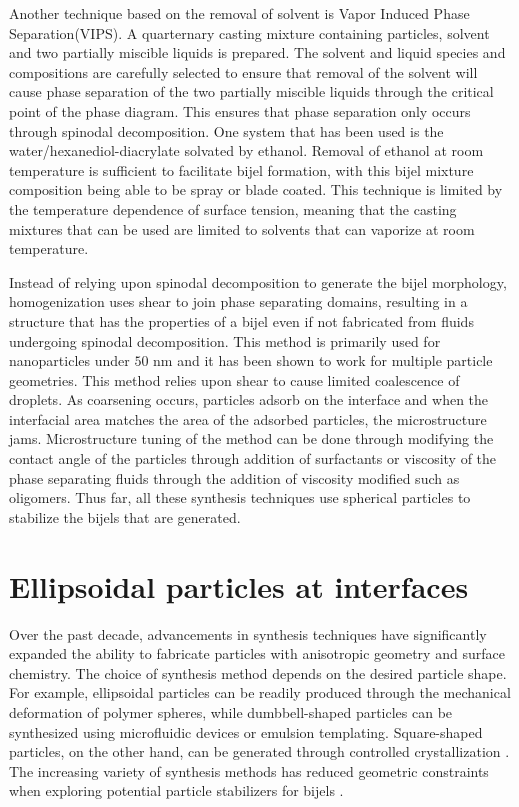 Another technique based on the removal of solvent is Vapor Induced Phase Separation(VIPS). \cite{wang_scalable_2020} A quarternary casting mixture
containing particles, solvent and two partially miscible liquids is prepared. The solvent and liquid species and compositions are carefully selected to ensure that 
removal of the solvent will cause phase separation of the two partially miscible liquids through the critical point of the phase diagram. This ensures that phase separation
only occurs through spinodal decomposition. One system that has been 
used is the water/hexanediol-diacrylate solvated by ethanol. Removal of ethanol at room temperature is sufficient to facilitate bijel formation, with this bijel
mixture composition being able to be spray or blade coated. This technique is limited by the temperature dependence of surface tension, meaning that the casting mixtures
that can be used are limited to solvents that can vaporize at room temperature.

Instead of relying upon spinodal decomposition to generate the bijel morphology, homogenization uses shear to join phase separating domains, resulting in a 
structure that has the properties of a bijel even if not fabricated from fluids undergoing spinodal decomposition. \cite{huang_bicontinuous_2017, cai_bijels_2017} 
This method is primarily used for nanoparticles under $50$ nm and it has been shown to work for multiple particle geometries. This method relies upon
shear to cause limited coalescence of droplets. As coarsening occurs, particles adsorb on the interface and when the interfacial area matches the area of the
adsorbed particles, the microstructure jams. Microstructure tuning of the method can be done through modifying the contact angle of the particles through addition of
surfactants or viscosity of the phase separating fluids through the addition of viscosity modified such as oligomers. Thus far, all these synthesis techniques use
spherical particles to stabilize the bijels that are generated. 

\section{Ellipsoidal particles at interfaces}

Over the past decade, advancements in synthesis techniques have significantly expanded the ability to fabricate particles with anisotropic geometry and surface chemistry. 
The choice of synthesis method depends on the desired particle shape. For example, ellipsoidal particles can be readily produced through the mechanical deformation of 
polymer spheres, while dumbbell-shaped particles can be synthesized using microfluidic devices or emulsion templating. \cite{fei_magneto-capillary_2020} 
Square-shaped particles, on the other hand, can be 
generated through controlled crystallization \cite{morgan_understanding_2013}. The increasing variety of synthesis methods has reduced geometric constraints when exploring 
potential particle stabilizers for bijels \cite{wu_recent_2016}.

